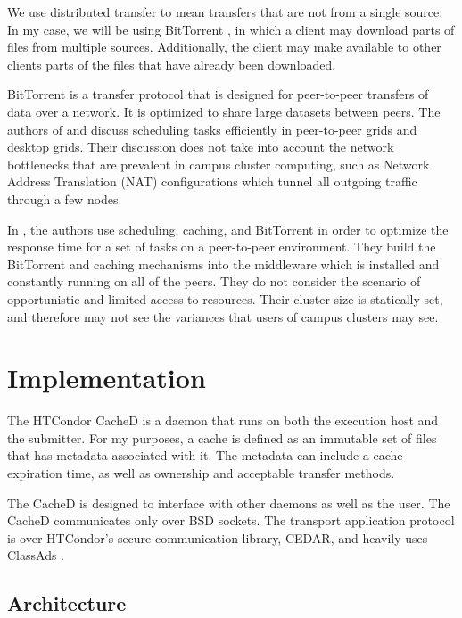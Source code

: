 We use distributed transfer to mean transfers that are not from a single source.  In my case, we will be using BitTorrent \cite{cohen2008BitTorrent}, in which a client may download parts of files from multiple sources.  Additionally, the client may make available to other clients parts of the files that have already been downloaded.

BitTorrent is a transfer protocol that is designed for peer-to-peer transfers of data over a network.  It is optimized to share large datasets between peers. The authors of \cite{wei2005scheduling} and \cite{wei2007towards} discuss scheduling tasks efficiently in peer-to-peer grids and desktop grids.  Their discussion does not take into account the network bottlenecks that are prevalent in campus cluster computing, such as Network Address Translation (NAT) configurations which tunnel all outgoing traffic through a few nodes.

In \cite{briquet2007scheduling}, the authors use scheduling, caching, and BitTorrent in order to optimize the response time for a set of tasks on a peer-to-peer environment.  They build the BitTorrent and caching mechanisms into the middleware which is installed and constantly running on all of the peers.  They do not consider the scenario of opportunistic and limited access to resources.  Their cluster size is statically set, and therefore may not see the variances that users of campus clusters may see.



\section{Implementation}

The HTCondor CacheD is a daemon that runs on both the execution host and the submitter.  For my purposes, a cache is defined as an immutable set of files that has metadata associated with it.  The metadata can include a cache expiration time, as well as ownership and acceptable transfer methods.

The CacheD is designed to interface with other daemons as well as the user.  The CacheD communicates only over BSD sockets. The transport application protocol is over HTCondor's secure communication library, CEDAR, and heavily uses ClassAds \cite{raman1998matchmaking}.  

\subsection{Architecture}

